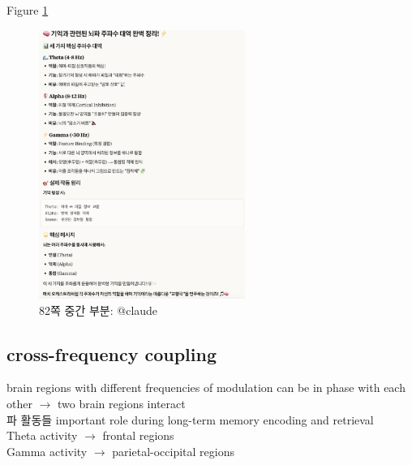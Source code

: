 \documentclass[../note.tex]{subfiles}
\begin{document}
Figure \ref{fig:waves2}\\
\begin{figure}[htbp]
  \centering
  \includegraphics[width=0.6\textwidth]{image/waves2}
  \caption{82쪽 중간 부분: @claude}
  \label{fig:waves2}
\end{figure}

\subsection{cross-frequency coupling}
brain regions with different frequencies of modulation can be in phase with each other $\rightarrow$ two brain regions interact\\

파 활동들 important role during long-term memory encoding and retrieval\\
Theta activity $\rightarrow$ frontal regions\\
Gamma activity $\rightarrow$ parietal-occipital regions\\
\end{document}
